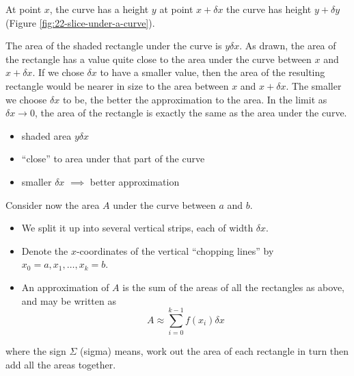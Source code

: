 \documentclass[
  english,
  11pt,
  oneside]{book}
\providecommand{\tightlist}{%
  \setlength{\itemsep}{0pt}\setlength{\parskip}{0pt}}
\newcommand{\slide}{}
\theoremstyle{definition}
\theoremstyle{definition}
\theoremstyle{definition}
\theoremstyle{definition}
\theoremstyle{remark}
\begin{document}
At point \(x\), the curve has a height \(y\) at point \(x + \delta x\) the curve has height \(y + \delta y\) (Figure \ref{fig:22-slice-under-a-curve}).

\begin{notslides}

The area of the shaded rectangle under the curve is \(y\delta x\). As drawn, the area of the rectangle has a value quite close to the area under the curve between \(x\) and \(x + \delta x\). If we chose \(\delta x\) to have a smaller value, then the area of the resulting rectangle would be nearer in size to the area between \(x\) and \(x + \delta x\). The smaller we choose \(\delta x\) to be, the better the approximation to the area. In the limit as \(\delta x \to 0\), the area of the rectangle is exactly the same as the area under the curve.

\end{notslides}

\begin{slidesonly}

\vfill

\begin{itemize}
\tightlist
\item
  shaded area \(y\delta x\)
\item
  ``close'' to area under that part of the curve
\item
  smaller \(\delta x\) \(\implies\) better approximation
\end{itemize}

\vfill
\slide

\end{slidesonly}

Consider now the area \(A\) under the curve between \(a\) and \(b\).

\begin{itemize}
\tightlist
\item
  We split it up into several vertical strips, each of width \(\delta x\).
\item
  Denote the \(x\)-coordinates of the vertical ``chopping lines'' by \(x_0=a, x_1, \dots, x_k=b\).
\item
  An approximation of \(A\) is the sum of the areas of all the rectangles as above, and may be written as
  \[A\approx\sum_{i=0}^{k-1}f(x_i)\delta x\]
\end{itemize}

\begin{notslides}

where the sign \(\Sigma\) (sigma) means, work out the area of each rectangle in turn then add all the areas together.

\end{notslides}
\end{document}
